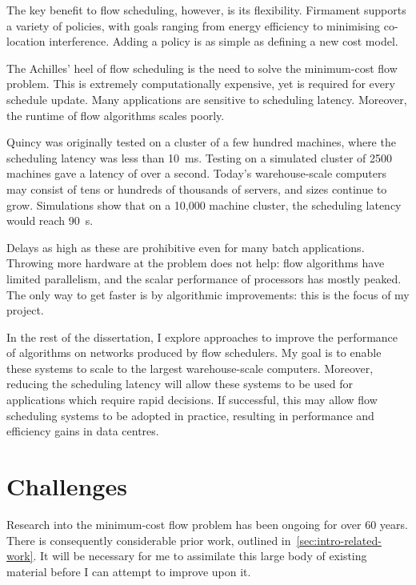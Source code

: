 The key benefit to flow scheduling, however, is its flexibility. Firmament supports a variety of policies, with goals ranging from energy efficiency to minimising co-location interference. Adding a policy is as simple as defining a new cost model.

The Achilles' heel of flow scheduling is the need to solve the minimum-cost flow problem. This is extremely computationally expensive, yet is required for every schedule update. Many applications are sensitive to scheduling latency. Moreover, the runtime of flow algorithms scales poorly. 

Quincy was originally tested on a cluster of a few hundred machines, where the scheduling latency was less than \SI{10}{\milli\second}. Testing on a simulated cluster of 2500 machines gave a latency of over a second. Today's warehouse-scale computers may consist of tens or hundreds of thousands of servers, and sizes continue to grow. Simulations show that on a 10,000 machine cluster, the scheduling latency would reach \SI{90}{\second}.

Delays as high as these are prohibitive even for many batch applications. Throwing more hardware at the problem does not help: flow algorithms have limited parallelism, and the scalar performance of processors has mostly peaked. The only way to get faster is by algorithmic improvements: this is the focus of my project.

In the rest of the dissertation, I explore approaches to improve the performance of algorithms on networks produced by flow schedulers. My goal is to enable these systems to scale to the largest warehouse-scale computers. Moreover, reducing the scheduling latency will allow these systems to be used for applications which require rapid decisions. If successful, this may allow flow scheduling systems to be adopted in practice, resulting in performance and efficiency gains in data centres.

\section{Challenges} \label{sec:intro-challenges}

Research into the minimum-cost flow problem has been ongoing for over 60 years. There is consequently considerable prior work, outlined in~\cref{sec:intro-related-work}. It will be necessary for me to assimilate this large body of existing material before I can attempt to improve upon it.

